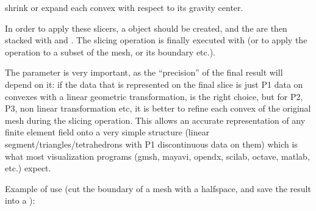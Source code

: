 \documentclass[a4paper,11pt,english]{sphinxmanual}
\begin{document}

\begin{fulllineitems}
\label{\detokenize{userdoc/export:_CPPv4N6getfem14slicer_explodeE1c}}%
\pysigstartmultiline
{}%
\pysigstopmultiline
shrink or expand each convex with respect to its gravity center.

\end{fulllineitems}


In order to apply these slicers, a  object should be
created, and the  are then stacked with
 and
. The slicing operation is
finally executed with  (or
 to apply the operation
to a subset of the mesh, or its boundary etc.).

The  parameter is very important, as the “precision” of the final result
will depend on it: if the data that is represented on the final slice is just P1
data on convexes with a linear geometric transformation,  is the
right choice, but for P2, P3, non linear transformation etc, it is better to refine
each convex of the original mesh during the slicing operation. This allows an
accurate representation of any finite element field onto a very simple structure
(linear segment/triangles/tetrahedrons with P1 discontinuous data on them) which is
what most visualization programs (gmsh, mayavi, opendx, scilab, octave, matlab, etc.) expect.

Example of use (cut the boundary of a mesh  with a half\sphinxhyphen{}space, and save the
result into a ):
\end{document}
